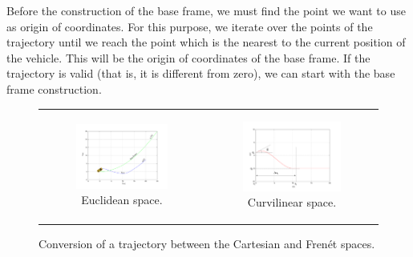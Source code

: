 Before the construction of the base frame, we must find the point we want to use as origin of coordinates. For this purpose, we iterate over the points of the trajectory until we reach the point which is the nearest to the current position of the vehicle. This will be the origin of coordinates of the base frame. If the trajectory is valid (that is, it is different from zero), we can start with the base frame construction.

\begin{figure}[h!]
\centering
\begin{tabular}{cc}
  \begin{subfigure}[b]{0.45\textwidth}
      \centering
      \includegraphics[width=\textwidth, trim=50 30 80 60,clip]{justOneCartesian45}
      \caption{Euclidean space.}
      \label{fig:cp07_justOneCartesian45}
  \end{subfigure} &
  \begin{subfigure}[b]{0.45\textwidth}
    \centering
    \includegraphics[width=\textwidth, trim=50 30 80 60,clip]{justOneFrenet45}
    \caption{Curvilinear space.}
    \label{fig:cp07_justOneFrenet45}
  \end{subfigure}%
\end{tabular}
\caption{Conversion of a trajectory between the Cartesian and Frenét spaces.}\label{fig:cp07_euclidean_frenet_conversion}
\end{figure}

